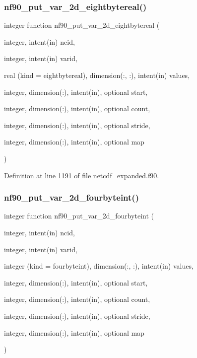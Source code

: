 \subsubsection{\texorpdfstring{nf90\+\_\+put\+\_\+var\+\_\+2d\+\_\+eightbytereal()}{nf90\_put\_var\_2d\_eightbytereal()}}
{\footnotesize\ttfamily integer function nf90\+\_\+put\+\_\+var\+\_\+2d\+\_\+eightbytereal (\begin{DoxyParamCaption}\item[{integer, intent(in)}]{ncid,  }\item[{integer, intent(in)}]{varid,  }\item[{real (kind = eightbytereal), dimension(\+:, \+:), intent(in)}]{values,  }\item[{integer, dimension(\+:), intent(in), optional}]{start,  }\item[{integer, dimension(\+:), intent(in), optional}]{count,  }\item[{integer, dimension(\+:), intent(in), optional}]{stride,  }\item[{integer, dimension(\+:), intent(in), optional}]{map }\end{DoxyParamCaption})}



Definition at line 1191 of file netcdf\+\_\+expanded.\+f90.

\mbox{\label{netcdf__expanded_8f90_aeff9a1bf24595308b60e34792ab192b5}} 
\subsubsection{\texorpdfstring{nf90\+\_\+put\+\_\+var\+\_\+2d\+\_\+fourbyteint()}{nf90\_put\_var\_2d\_fourbyteint()}}
{\footnotesize\ttfamily integer function nf90\+\_\+put\+\_\+var\+\_\+2d\+\_\+fourbyteint (\begin{DoxyParamCaption}\item[{integer, intent(in)}]{ncid,  }\item[{integer, intent(in)}]{varid,  }\item[{integer (kind = fourbyteint), dimension(\+:, \+:), intent(in)}]{values,  }\item[{integer, dimension(\+:), intent(in), optional}]{start,  }\item[{integer, dimension(\+:), intent(in), optional}]{count,  }\item[{integer, dimension(\+:), intent(in), optional}]{stride,  }\item[{integer, dimension(\+:), intent(in), optional}]{map }\end{DoxyParamCaption})}



